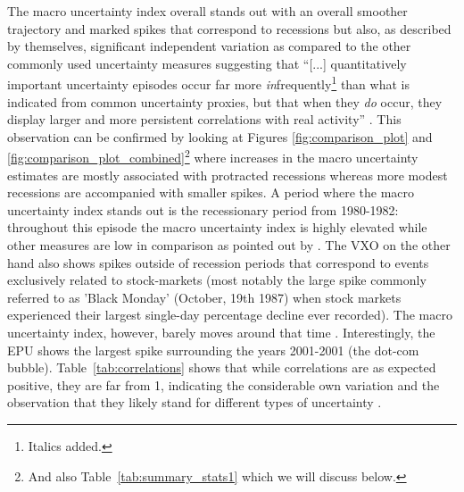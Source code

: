 \documentclass[a4paper,11pt,listof=nochaptergap,oneside,pointednumbers,bibtotoc,bigheadings,liststotoc,hidelinks]{scrbook}
\theoremstyle{mysatz}
\theoremstyle{mydefinition}
\theoremstyle{mytheorem}
\theoremstyle{mybemerkung}
\begin{document}
The macro uncertainty index overall stands out with an overall smoother trajectory and marked spikes that correspond to recessions but also, as described by \citet{juradoetal:15} themselves, significant independent variation as compared to the other commonly used uncertainty measures suggesting that ``[...] quantitatively important uncertainty episodes occur far more \textit{in}frequently\footnote{Italics added.} than what is indicated from common uncertainty proxies, but that when they \textit{do} occur, they display larger and more persistent correlations with real activity'' \citep[p. 1181]{juradoetal:15}. This observation can be confirmed by looking at Figures \ref{fig:comparison_plot} and \ref{fig:comparison_plot_combined}\footnote{And also Table~\ref{tab:summary_stats1} which we will discuss below.} where increases in the macro uncertainty estimates are mostly associated with protracted recessions whereas more modest recessions are accompanied with smaller spikes. A period where the macro uncertainty index stands out is the recessionary period from 1980-1982: throughout this episode the macro uncertainty index is highly elevated while other measures are low in comparison as pointed out by \citet{juradoetal:15}. The VXO on the other hand also shows spikes outside of recession periods that correspond to events exclusively related to stock-markets (most notably the large spike commonly referred to as 'Black Monday' (October, 19th 1987) when stock markets experienced their largest single-day percentage decline ever recorded). The macro uncertainty index, however, barely moves around that time \citep{juradoetal:15}. Interestingly, the EPU shows the largest spike surrounding the years 2001-2001 (the dot-com bubble). Table~\ref{tab:correlations} shows that while correlations are as expected positive, they are far from 1, indicating the considerable own variation and the observation that they likely stand for different types of uncertainty \citep{bachmannetal:13}.

\begin{table}[t]
\centering
\caption[Correlation matrix of uncertainty measures.]{Correlation matrix of the uncertainty measures from Figure~\ref{fig:comparison_plot}. \\ \textit{Note:} Correlations are calculated for the period where all three uncertainty measures overlap, i.e. 07:1962 - 10:2014}
\label{tab:correlations}
\end{table}
\end{document}
